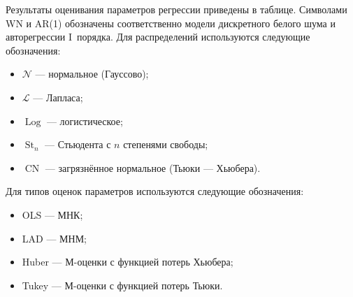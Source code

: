 \documentclass[12pt,a4paper]{article}
\newcommand{\normallaw}{\mathcal{N}}
\newcommand{\Laplacelaw}{\mathcal{L}}
\newcommand{\logisticlaw}{\operatorname{Log}}
\newcommand{\Studentlaw}{\operatorname{St}}
\newcommand{\Tukeylaw}{\operatorname{CN}}
\begin{document}
	Результаты оценивания параметров регрессии приведены в таблице. Символами WN и AR(1) обозначены соответственно модели дискретного белого шума и авторегрессии I~порядка. Для распределений используются следующие обозначения:
	\begin{itemize}
		\item $\normallaw$ --- нормальное (Гауссово);
		\item $\Laplacelaw$ --- Лапласа;
		\item $\logisticlaw$ --- логистическое;
		\item $\Studentlaw_n$ --- Стьюдента с $n$ степенями свободы;
		\item $\Tukeylaw$ --- загрязнённое нормальное (Тьюки --- Хьюбера).
	\end{itemize}
	Для типов оценок параметров используются следующие обозначения:
	\begin{itemize}
		\item OLS --- МНК;
		\item LAD --- МНМ;
		\item Huber --- М-оценки с функцией потерь Хьюбера;
		\item Tukey --- М-оценки с функцией потерь Тьюки.
	\end{itemize}
	
\end{document}
